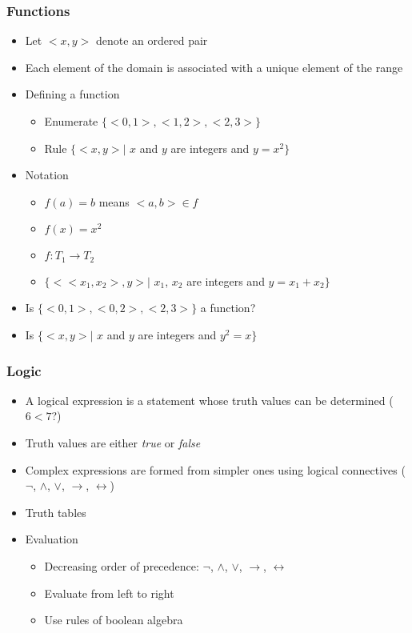 \documentclass[t,12pt,numbers,fleqn]{beamer}
\begin{document}
\begin{frame}
\frametitle{Functions}
\begin{itemize}
\item Let $<x, y>$ denote an ordered pair
\item Each element of the domain is associated with a unique element of the range
\item Defining a function
\begin{itemize}
\item Enumerate $\{ <0, 1>, <1, 2>, <2, 3> \}$
\item Rule $\{ <x, y> |$ $x$ and $y$ are integers and $y = x^2 \}$
\end{itemize}
\item Notation
\begin{itemize}
\item $f(a) = b$ means $<a, b> \in f$
\item $f(x) = x^2$
\item $f: T_1 \rightarrow T_2$
\item $\{ <<x_1, x_2>, y> |$ $x_1$, $x_2$ are integers and $y = x_1 + x_2 \}$
\end{itemize}
\item Is $\{ <0, 1>, <0, 2>, <2, 3> \}$ a function?
\item Is $\{ <x, y> |$ $x$ and $y$ are integers and $y^2 = x\}$
\end{itemize}
\end{frame}


\begin{frame}
\frametitle{Logic}
\begin{itemize}
\item A logical expression is a statement whose truth values can be determined ($6 < 7$?)
\item Truth values are either \emph{true} or \emph{false}
\item Complex expressions are formed from simpler ones using logical connectives ($\neg$, $\wedge$, $\vee$,
$\rightarrow$, $\leftrightarrow$)
\item Truth tables
\item Evaluation
\begin{itemize}
\item Decreasing order of precedence: $\neg$, $\wedge$, $\vee$,
$\rightarrow$, $\leftrightarrow$
\item Evaluate from left to right
\item Use rules of boolean algebra
\end{itemize}
\end{itemize}
\end{frame}
\end{document}
